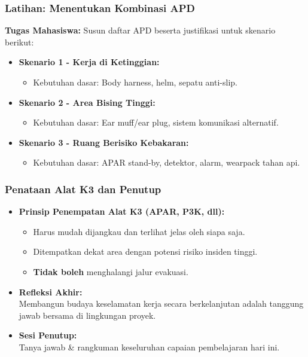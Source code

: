 \documentclass[../main.tex]{subfiles}
\begin{document}
\begin{frame}[t, mytitle=imageplus]
	\frametitle{Latihan: Menentukan Kombinasi APD}
	\textbf{Tugas Mahasiswa:} Susun daftar APD beserta justifikasi untuk skenario berikut:
	\vspace{0.3cm}
	\begin{itemize}
		\item \textbf{Skenario 1 - Kerja di Ketinggian:}
		      \begin{itemize}
			      \item Kebutuhan dasar: Body harness, helm, sepatu anti-slip.
		      \end{itemize}
		\item \textbf{Skenario 2 - Area Bising Tinggi:}
		      \begin{itemize}
			      \item Kebutuhan dasar: Ear muff/ear plug, sistem komunikasi alternatif.
		      \end{itemize}
		\item \textbf{Skenario 3 - Ruang Berisiko Kebakaran:}
		      \begin{itemize}
			      \item Kebutuhan dasar: APAR stand-by, detektor, alarm, wearpack tahan api.
		      \end{itemize}
	\end{itemize}
\end{frame}

\begin{frame}[c, mytitle=center]
	\frametitle{Penataan Alat K3 dan Penutup}
	\begin{itemize}
		\item \textbf{Prinsip Penempatan Alat K3 (APAR, P3K, dll):}
		      \begin{itemize}
			      \item Harus mudah dijangkau dan terlihat jelas oleh siapa saja.
			      \item Ditempatkan dekat area dengan potensi risiko insiden tinggi.
			      \item \textbf{Tidak boleh} menghalangi jalur evakuasi.
		      \end{itemize}
		      \vspace{0.4cm}
		\item \textbf{Refleksi Akhir:} \\ Membangun budaya keselamatan kerja secara berkelanjutan adalah tanggung jawab bersama di lingkungan proyek.
		      \vspace{0.4cm}
		\item \textbf{Sesi Penutup:} \\ Tanya jawab \& rangkuman keseluruhan capaian pembelajaran hari ini.
	\end{itemize}
\end{frame}
\end{document}
